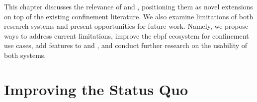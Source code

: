 This chapter discusses the relevance of \bpfbox{} and \bpfcontain{}, positioning them as
novel extensions on top of the existing confinement literature. We also examine
limitations of both research systems and present opportunities for future work. Namely, we
propose ways to address current limitations, improve the \gls{ebpf} ecosystem for
confinement use cases, add features to \bpfbox{} and \bpfcontain{}, and conduct further
research on the usability of both systems.

\section{Improving the Status Quo}%
\label{s:disc-improving}


